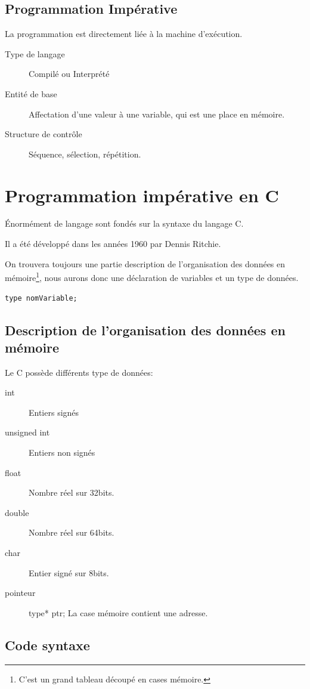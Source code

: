 \documentclass[12pt,a4paper,openany]{book}
\begin{document}
		\section{Programmation Impérative}\label{imperative}
			La programmation est directement liée à la machine d'exécution.
			\begin{description}	
				\item[Type de langage] Compilé ou Interprété
				\item[Entité de base] Affectation d'une valeur à une variable, qui est une place en mémoire.
				\item[Structure de contrôle] Séquence, sélection, répétition.
			\end{description}

	\chapter{Programmation impérative en C}
	Énormément de langage sont fondés sur la syntaxe du langage C.

	Il a été développé dans les années 1960 par Dennis Ritchie. 

	On trouvera toujours une partie description de l'organisation des données en mémoire\footnote{C'est un grand tableau découpé en cases mémoire.},
	nous aurons donc une déclaration de variables et un type de données.
	\begin{lstlisting}[caption=Syntaxe de déclaration de variable]
type nomVariable;		
	\end{lstlisting}
	\section{Description de l'organisation des données en mémoire}\label{types}
	Le C possède différents type de données: 
	\begin{description}
		\item[int] Entiers signés
		\item[unsigned int] Entiers non signés 
		\item[float] Nombre réel sur 32bits. 
		\item[double] Nombre réel sur 64bits.
		\item[char] Entier signé sur 8bits.
		\item[pointeur] type* ptr; La case mémoire contient une adresse.
	\end{description}
	\section{Code syntaxe}
\end{document}

